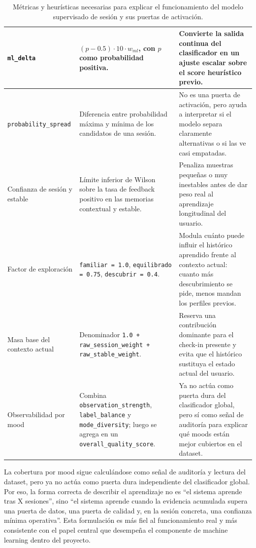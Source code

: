 \begin{table}[H]
\begin{tabularx}{\textwidth}{|P{3.2cm}|P{4.9cm}|Y|}
\hline
\texttt{ml\_delta} & \((p - 0.5) \cdot 10 \cdot w_{ml}\), con \(p\) como probabilidad positiva. & Convierte la salida continua del clasificador en un ajuste escalar sobre el score heurístico previo. \\
\hline
\texttt{probability\_spread} & Diferencia entre probabilidad máxima y mínima de los candidatos de una sesión. & No es una puerta de activación, pero ayuda a interpretar si el modelo separa claramente alternativas o si las ve casi empatadas. \\
\hline
Confianza de sesión y estable & Límite inferior de Wilson sobre la tasa de feedback positivo en las memorias contextual y estable. & Penaliza muestras pequeñas o muy inestables antes de dar peso real al aprendizaje longitudinal del usuario. \\
\hline
Factor de exploración & \texttt{familiar = 1.0}, \texttt{equilibrado = 0.75}, \texttt{descubrir = 0.4}. & Modula cuánto puede influir el histórico aprendido frente al contexto actual: cuanto más descubrimiento se pide, menos mandan los perfiles previos. \\
\hline
Masa base del contexto actual & Denominador \texttt{1.0 + raw\_session\_weight + raw\_stable\_weight}. & Reserva una contribución dominante para el check-in presente y evita que el histórico sustituya el estado actual del usuario. \\
\hline
Observabilidad por mood & Combina \texttt{observation\_strength}, \texttt{label\_balance} y \texttt{mode\_diversity}; luego se agrega en un \texttt{overall\_quality\_score}. & Ya no actúa como puerta dura del clasificador global, pero sí como señal de auditoría para explicar qué moods están mejor cubiertos en el dataset. \\
\hline
\end{tabularx}
\caption{Métricas y heurísticas necesarias para explicar el funcionamiento del modelo supervisado de sesión y sus puertas de activación.}
\label{tab:metricas_heuristicas_modelo_sesion}
\end{table}

La cobertura por mood sigue calculándose como señal de auditoría y lectura del
dataset, pero ya no actúa como puerta dura independiente del clasificador
global. Por eso, la forma correcta de describir el aprendizaje no es ``el
sistema aprende tras X sesiones'', sino ``el sistema aprende cuando la
evidencia acumulada supera una puerta de datos, una puerta de calidad y, en la
sesión concreta, una confianza mínima operativa''. Esta formulación es más
fiel al funcionamiento real y más consistente con el papel central que
desempeña el componente de machine learning dentro del proyecto.

